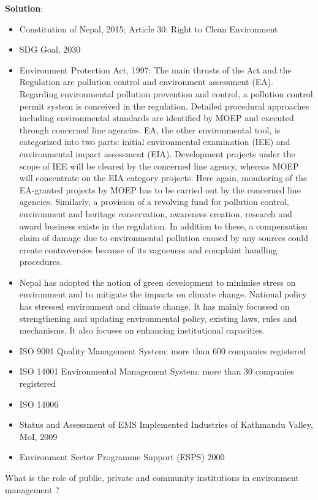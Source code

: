 \documentclass[
]{book}
\newcommand{\question}{\item}
\newenvironment{solution}{ {\bfseries Solution}:}{}
\begin{document}
\begin{questions}
\begin{solution}
\begin{itemize}
\item Constitution of Nepal, 2015; Article 30: Right to Clean Environment
\item SDG Goal, 2030
\item Environment Protection Act, 1997: The main thrusts of the Act and the Regulation are pollution control and environment assessment (EA). Regarding environmental pollution prevention and control, a pollution control permit system is conceived in the regulation. Detailed procedural approaches including environmental standards are identified by MOEP and executed through concerned line agencies. EA, the other environmental tool, is categorized into two parts: initial environmental examination (IEE) and environmental impact assessment (EIA). Development projects under the scope of IEE will be cleared by the concerned line agency, whereas MOEP will concentrate on the EIA category projects. Here again, monitoring of the EA-granted projects by MOEP has to be carried out by the concerned line agencies. Similarly, a provision of a revolving fund for pollution control, environment and heritage conservation, awareness creation, research and award business exists in the regulation. In addition to these, a compensation claim of damage due to environmental pollution caused by any sources could create controversies because of its vagueness and complaint handling procedures.
\item Nepal has adopted the notion of green development to minimise stress on environment and to mitigate the impacts on climate change. National policy has stressed environment and climate change. It has mainly focussed on strengthening and updating environmental policy, existing laws, rules and mechanisms. It also focuses on enhancing institutional capacities.
\item ISO 9001 Quality Management System: more than 600 companies registered
\item ISO 14001 Environmental Management System: more than 30 companies registered
\item ISO 14006
\item Status and Assessment of EMS Implemented Industries of Kathmandu Valley, MoI, 2009 
\item Environment Sector Programme Support (ESPS) 2000
\end{itemize}

\end{solution}

\question What is the role of public, private and community institutions in environment management ?


\end{questions}
\end{document}
